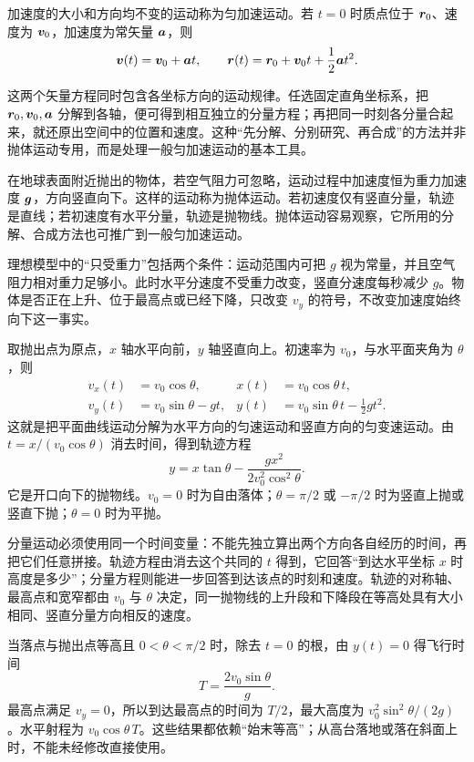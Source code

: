 {加速度的大小和方向均不变的运动称为匀加速运动。若 $t=0$ 时质点位于 $\bm{r}_0$、速度为 $\bm{v}_0$，加速度为常矢量 $\bm{a}$，则
\begin{equation}
 \bm{v}(t)=\bm{v}_0+\bm{a} t,\qquad
 \bm{r}(t)=\bm{r}_0+\bm{v}_0t+\frac12\bm{a} t^2.
\end{equation}

这两个矢量方程同时包含各坐标方向的运动规律。任选固定直角坐标系，把 $\bm{r}_0,\bm{v}_0,\bm{a}$ 分解到各轴，便可得到相互独立的分量方程；再把同一时刻各分量合起来，就还原出空间中的位置和速度。这种“先分解、分别研究、再合成”的方法并非抛体运动专用，而是处理一般匀加速运动的基本工具。

在地球表面附近抛出的物体，若空气阻力可忽略，运动过程中加速度恒为重力加速度 $\bm{g}$，方向竖直向下。这样的运动称为抛体运动。若初速度仅有竖直分量，轨迹是直线；若初速度有水平分量，轨迹是抛物线。抛体运动容易观察，它所用的分解、合成方法也可推广到一般匀加速运动。

理想模型中的“只受重力”包括两个条件：运动范围内可把 $g$ 视为常量，并且空气阻力相对重力足够小。此时水平分速度不受重力改变，竖直分速度每秒减少 $g$。物体是否正在上升、位于最高点或已经下降，只改变 $v_y$ 的符号，不改变加速度始终向下这一事实。

取抛出点为原点，$x$ 轴水平向前，$y$ 轴竖直向上。初速率为 $v_0$，与水平面夹角为 $\theta$，则
\begin{align}
v_x(t)&=v_0\cos\theta,&x(t)&=v_0\cos\theta\,t,\\
v_y(t)&=v_0\sin\theta-gt,&y(t)&=v_0\sin\theta\,t-\frac12gt^2.
\end{align}
这就是把平面曲线运动分解为水平方向的匀速运动和竖直方向的匀变速运动。由 $t=x/(v_0\cos\theta)$ 消去时间，得到轨迹方程
\begin{equation}
 \boxed{y=x\tan\theta-\frac{gx^2}{2v_0^2\cos^2\theta}}.
\end{equation}
它是开口向下的抛物线。$v_0=0$ 时为自由落体；$\theta=\pi/2$ 或 $-\pi/2$ 时为竖直上抛或竖直下抛；$\theta=0$ 时为平抛。

分量运动必须使用同一个时间变量：不能先独立算出两个方向各自经历的时间，再把它们任意拼接。轨迹方程由消去这个共同的 $t$ 得到，它回答“到达水平坐标 $x$ 时高度是多少”；分量方程则能进一步回答到达该点的时刻和速度。轨迹的对称轴、最高点和宽窄都由 $v_0$ 与 $\theta$ 决定，同一抛物线的上升段和下降段在等高处具有大小相同、竖直分量方向相反的速度。

当落点与抛出点等高且 $0<\theta<\pi/2$ 时，除去 $t=0$ 的根，由 $y(t)=0$ 得飞行时间
\begin{equation}
 T=\frac{2v_0\sin\theta}{g}.
\end{equation}
最高点满足 $v_y=0$，所以到达最高点的时间为 $T/2$，最大高度为 $v_0^2\sin^2\theta/(2g)$。水平射程为 $v_0\cos\theta\,T$。这些结果都依赖“始末等高”；从高台落地或落在斜面上时，不能未经修改直接使用。

}
